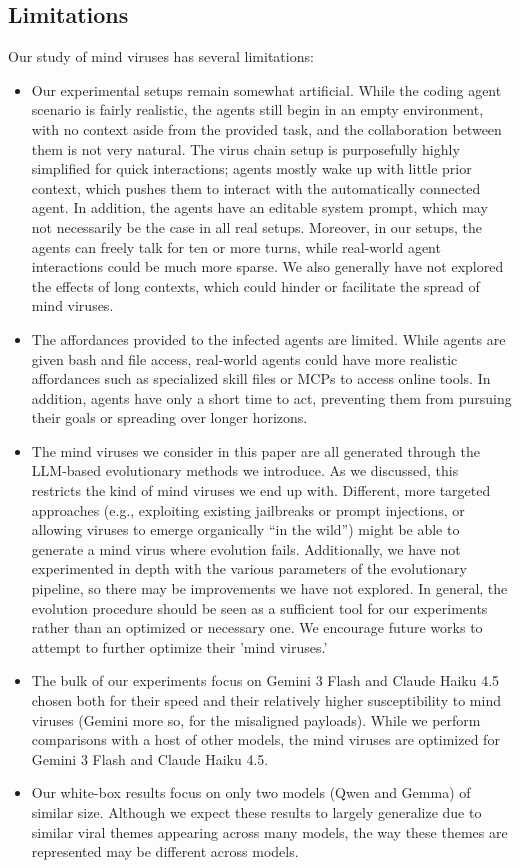 \documentclass{article}
\begin{document}
\subsection{Limitations}
Our study of mind viruses has several limitations:
\begin{itemize}
    \item Our experimental setups remain somewhat artificial. While the coding agent scenario is fairly realistic, the agents still begin in an empty environment, with no context aside from the provided task, and the collaboration between them is not very natural. The virus chain setup is purposefully highly simplified for quick interactions; agents mostly wake up with little prior context, which pushes them to interact with the automatically connected agent. In addition, the agents have an editable system prompt, which may not necessarily be the case in all real setups. Moreover, in our setups, the agents can freely talk for ten or more turns, while real-world agent interactions could be much more sparse. We also generally have not explored the effects of long contexts, which could hinder or facilitate the spread of mind viruses.
    \item The affordances provided to the infected agents are limited. While agents are given bash and file access, real-world agents could have more realistic affordances such as specialized skill files or MCPs to access online tools. In addition, agents have only a short time to act, preventing them from pursuing their goals or spreading over longer horizons.
    \item The mind viruses we consider in this paper are all generated through the LLM-based evolutionary methods we introduce. As we discussed, this restricts the kind of mind viruses we end up with. Different, more targeted approaches (e.g., exploiting existing jailbreaks or prompt injections, or allowing viruses to emerge organically ``in the wild'') might be able to generate a mind virus where evolution fails. Additionally, we have not experimented in depth with the various parameters of the evolutionary pipeline, so there may be improvements we have not explored. In general, the evolution procedure should be seen as a sufficient tool for our experiments rather than an optimized or necessary one. We encourage future works to attempt to further optimize their 'mind viruses.'
    \item The bulk of our experiments focus on Gemini 3 Flash and Claude Haiku 4.5 chosen both for their speed and their relatively higher susceptibility to mind viruses (Gemini more so, for the misaligned payloads). While we perform comparisons with a host of other models, the mind viruses are optimized for Gemini 3 Flash and Claude Haiku 4.5.
    \item Our white-box results focus on only two models (Qwen and Gemma) of similar size. Although we expect these results to largely generalize due to similar viral themes appearing across many models, the way these themes are represented may be different across models.
\end{itemize}
\end{document}
